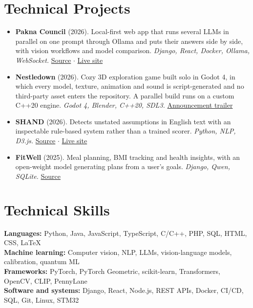 \documentclass[10pt,letterpaper]{article}
\let\origsection\section
\renewcommand{\section}[1]{\needspace{5\baselineskip}\origsection{#1}}
\begin{document}
\section{Technical Projects}
\begin{itemize}
  \item \textbf{Pakna Council} (2026). Local-first web app that runs several LLMs in parallel on one
    prompt through Ollama and puts their answers side by side, with vision workflows and model
    comparison. \textit{Django, React, Docker, Ollama, WebSocket.}
    \href{https://github.com/minhaz-42/Pakna_council}{Source} $\cdot$
    \href{https://pakna-council.vercel.app/}{Live site}
  \item \textbf{Nestledown} (2026). Cozy 3D exploration game built solo in Godot 4, in which every
    model, texture, animation and sound is script-generated and no third-party asset enters the
    repository. A parallel build runs on a custom C++20 engine.
    \textit{Godot 4, Blender, C++20, SDL3.}
    \href{https://youtu.be/MUN7_kuh00U}{Announcement trailer}
  \item \textbf{SHAND} (2026). Detects unstated assumptions in English text with an inspectable
    rule-based system rather than a trained scorer. \textit{Python, NLP, D3.js.}
    \href{https://github.com/minhaz-42/SHAND}{Source} $\cdot$
    \href{https://shand1.vercel.app/}{Live site}
  \item \textbf{FitWell} (2025). Meal planning, BMI tracking and health insights, with an
    open-weight model generating plans from a user's goals. \textit{Django, Qwen, SQLite.}
    \href{https://github.com/minhaz-42/FitWell-Using-Django}{Source}
\end{itemize}

\section{Technical Skills}
\textbf{Languages:} Python, Java, JavaScript, TypeScript, C/C++, PHP, SQL, HTML, CSS, LaTeX\\[3pt]
\textbf{Machine learning:} Computer vision, NLP, LLMs, vision-language models, calibration, quantum ML\\[3pt]
\textbf{Frameworks:} PyTorch, PyTorch Geometric, scikit-learn, Transformers, OpenCV, CLIP, PennyLane\\[3pt]
\textbf{Software and systems:} Django, React, Node.js, REST APIs, Docker, CI/CD, SQL, Git, Linux, STM32
\end{document}
